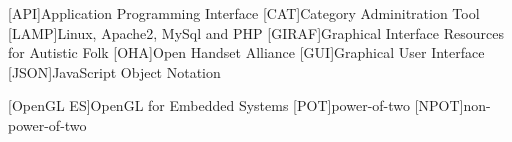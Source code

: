 [API]{Application Programming Interface}
[CAT]{Category Adminitration Tool}
[LAMP]{Linux, Apache2, MySql and PHP}
[GIRAF]{Graphical Interface Resources for Autistic Folk}
[OHA]{Open Handset Alliance}
[GUI]{Graphical User Interface}
[JSON]{JavaScript Object Notation}

[OpenGL ES]{OpenGL for Embedded Systems}
[POT]{power-of-two}
[NPOT]{non-power-of-two}